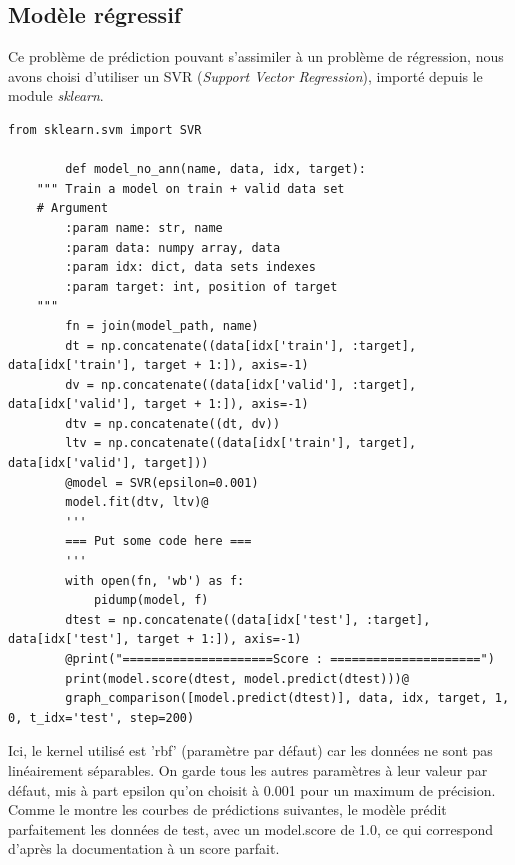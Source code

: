 \documentclass{article}
\begin{document}
    \subsection{Modèle régressif}
    Ce problème de prédiction pouvant s'assimiler à un problème de régression, nous avons choisi d'utiliser un SVR (\textit{Support Vector Regression}), importé depuis le module \textit{sklearn}.
    \begin{lstlisting}[frame=single]
        from sklearn.svm import SVR

        def model_no_ann(name, data, idx, target):
    """ Train a model on train + valid data set
    # Argument
        :param name: str, name
        :param data: numpy array, data
        :param idx: dict, data sets indexes
        :param target: int, position of target
    """
        fn = join(model_path, name)
        dt = np.concatenate((data[idx['train'], :target], data[idx['train'], target + 1:]), axis=-1)
        dv = np.concatenate((data[idx['valid'], :target], data[idx['valid'], target + 1:]), axis=-1)
        dtv = np.concatenate((dt, dv))
        ltv = np.concatenate((data[idx['train'], target], data[idx['valid'], target]))
        @model = SVR(epsilon=0.001)
        model.fit(dtv, ltv)@
        '''
        === Put some code here ===
        '''
        with open(fn, 'wb') as f:
            pidump(model, f)
        dtest = np.concatenate((data[idx['test'], :target], data[idx['test'], target + 1:]), axis=-1)
        @print("=====================Score : =====================")
        print(model.score(dtest, model.predict(dtest)))@
        graph_comparison([model.predict(dtest)], data, idx, target, 1, 0, t_idx='test', step=200)
    \end{lstlisting}
    Ici, le kernel utilisé est 'rbf' (paramètre par défaut) car les données ne sont pas linéairement séparables. On garde tous les autres paramètres à leur valeur par défaut, mis à part epsilon qu'on choisit à 0.001 pour un maximum de précision. Comme le montre les courbes de prédictions suivantes, le modèle prédit parfaitement les données de test, avec un model.score de 1.0, ce qui correspond d'après la documentation à un score parfait.
\end{document}
